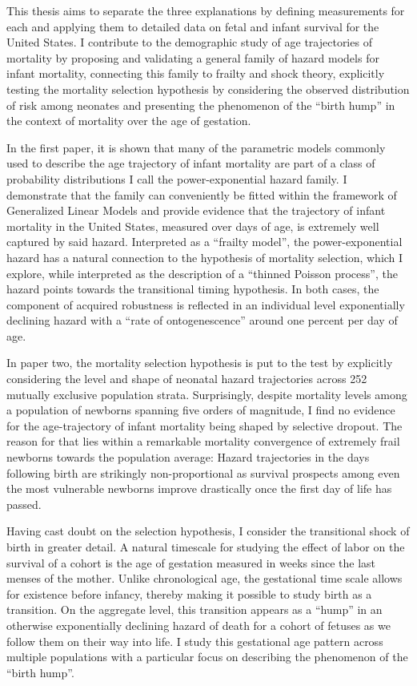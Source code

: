 \documentclass[10pt, twoside]{book}
\begin{document}
This thesis aims to separate the three explanations by defining measurements for each and applying them to detailed data on fetal and infant survival for the United States. I contribute to the demographic study of age trajectories of mortality by proposing and validating a general family of hazard models for infant mortality, connecting this family to frailty and shock theory, explicitly testing the mortality selection hypothesis by considering the observed distribution of risk among neonates and presenting the phenomenon of the ``birth hump'' in the context of mortality over the age of gestation.

In the first paper, it is shown that many of the parametric models commonly used to describe the age trajectory of infant mortality are part of a class of probability distributions I call the power-exponential hazard family. I demonstrate that the family can conveniently be fitted within the framework of Generalized Linear Models and provide evidence that the trajectory of infant mortality in the United States, measured over days of age, is extremely well captured by said hazard. Interpreted as a ``frailty model'', the power-exponential hazard has a natural connection to the hypothesis of mortality selection, which I explore, while interpreted as the description of a ``thinned Poisson process'', the hazard points towards the transitional timing hypothesis. In both cases, the component of acquired robustness is reflected in an individual level exponentially declining hazard with a ``rate of ontogenescence'' around one percent per day of age.

In paper two, the mortality selection hypothesis is put to the test by explicitly considering the level and shape of neonatal hazard trajectories across 252 mutually exclusive population strata. Surprisingly, despite mortality levels among a population of newborns spanning five orders of magnitude, I find no evidence for the age-trajectory of infant mortality being shaped by selective dropout. The reason for that lies within a remarkable mortality convergence of extremely frail newborns towards the population average: Hazard trajectories in the days following birth are strikingly non-proportional as survival prospects among even the most vulnerable newborns improve drastically once the first day of life has passed.

Having cast doubt on the selection hypothesis, I consider the transitional shock of birth in greater detail. A natural timescale for studying the effect of labor on the survival of a cohort is the age of gestation measured in weeks since the last menses of the mother. Unlike chronological age, the gestational time scale allows for existence before infancy, thereby making it possible to study birth as a transition. On the aggregate level, this transition appears as a ``hump'' in an otherwise exponentially declining hazard of death for a cohort of fetuses as we follow them on their way into life. I study this gestational age pattern across multiple populations with a particular focus on describing the phenomenon of the ``birth hump''.
\end{document}
